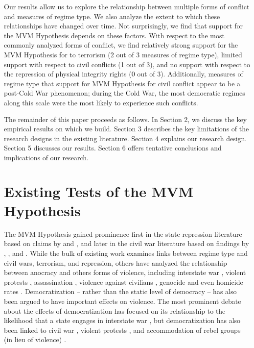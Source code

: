 \documentclass[titlepage, onecolumn,12pt]{article}
\begin{document}
Our results allow us to explore the relationship between multiple forms of conflict and measures of regime type.  We also analyze the extent to which these relationships have changed over time. Not surprisingly, we find that support for the MVM Hypothesis depends on these factors. With respect to the most commonly analyzed forms of conflict, we find relatively strong support for the MVM Hypothesis for to terrorism (2 out of 3 measures of regime type), limited support with respect to civil conflicts (1 out of 3), and no support with respect to the repression of physical integrity rights (0 out of 3). Additionally, measures of regime type that support for MVM Hypothesis for civil conflict appear to be a post-Cold War phenomenon; during the Cold War, the most democratic regimes along this scale were the most likely to experience such conflicts.

The remainder of this paper proceeds as follows.  In Section 2, we discuss the key empirical results on which we build.  Section 3 describes the key  limitations of the research designs in the existing literature. Section 4 explains our research design.  Section 5 discusses our results.  Section 6 offers tentative conclusions and implications of our research.


\section{Existing Tests of the MVM Hypothesis}

The MVM Hypothesis gained prominence first in the state repression literature based on claims by \citet{muller1985income} and \citet{fein1995more}, and later in the civil war literature based on findings by \citet{ellingsen2000colorful}, \citet{hegre2001toward}, and \citet{fearon2003ethnicity}.  While the bulk of existing work examines links between regime type and civil wars, terrorism, and repression, others have analyzed the relationship between
anocracy and others forms of violence, including interstate war \citep{thompson1997tale,enterline1998regime,o2002anticipating}, violent protests \citep{murdie2011aiding}, assassination \citep{iqbal2006sic}, violence against civilians \citep{eck2007one,hultman2012attacks}, genocide \citep{harff2003no} and even homicide rates \citep{chu2013role}. Democratization -- rather than the static level of democracy -- has also been argued to have important effects on violence. The most prominent debate about the effects of democratization has focused on its relationship to the likelihood that a state engages in interstate war \citep{ward1998democratizing,gleditsch2000war,crescenzi1999ripples,mansfield2002democratic,mansfield2002incomplete,narang2009these}, but democratization has also been linked to civil war \citep{savun2011foreign}, violent protests \citep{murdie2011aiding}, and accommodation of rebel groups (in lieu of violence) \citep{walter2006building}.
\end{document}
